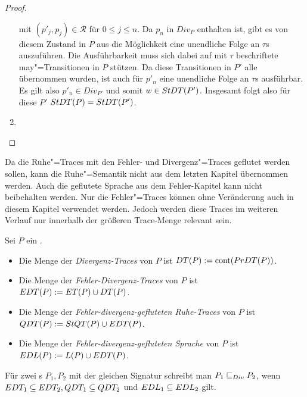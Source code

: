 \begin{proof}
\begin{enumerate}
  mit $(p'_j,p_j) \in \mathcal{R}$ für $0\leq j \leq n$. Da $p_n$ in $Div _P$
  enthalten ist, gibt es von diesem Zustand in $P$ aus die Möglichkeit eine
  unendliche Folge an $\tau$s auszuführen. Die Ausführbarkeit muss sich dabei
  auf mit $\tau$ beschriftete may"=Transitionen in $P$ stützen. Da diese
  Transitionen in $P'$ alle übernommen wurden, ist auch für $p'_n$ eine
  unendliche Folge an $\tau$s ausführbar. Es gilt also $p'_n\in Div _{P'}$ und
  somit $w\in StDT (P')$. Insgesamt folgt also für diese $P'$ $StDT (P) =
  StDT (P')$.
    \item {}
  \end{enumerate}
\end{proof}

Da die Ruhe"=Traces mit den Fehler- und Divergenz"=Traces geflutet werden
sollen, kann die Ruhe"=Semantik nicht aus dem letzten Kapitel übernommen
werden. Auch die geflutete Sprache aus dem Fehler-Kapitel kann nicht
beibehalten werden. Nur die Fehler"=Traces \ET{} können ohne Veränderung auch
in diesem Kapitel verwendet werden. Jedoch werden diese Traces im weiteren
Verlauf nur innerhalb der größeren Trace-Menge \EDT{} relevant sein.

\begin{Def}
  \label{DivSemDef}
  Sei $P$ ein \MEIO{}.
  \begin{itemize}
    \item Die Menge der \emph{Divergenz-Traces} von $P$ ist $DT (P) := \mathrm{cont}
      (PrDT (P))$.
    \item Die Menge der \emph{Fehler-Divergenz-Traces} von $P$ ist $EDT (P) :=
      ET (P)\cup DT (P)$.
    \item Die Menge der \emph{Fehler-divergenz-gefluteten
      Ruhe-Traces} von $P$ ist $QDT (P) := StQT (P)\cup EDT (P)$.
    \item Die Menge der \emph{Fehler-divergenz-gefluteten
      Sprache} von $P$ ist $EDL (P) := L(P)\cup EDT (P)$.
  \end{itemize}
  Für zwei \MEIO{}s $P_1,P_2$ mit der gleichen Signatur schreibt man $P_1 \sqsubseteq  _{Div}
  P_2$, wenn $EDT _1\subseteq EDT _2, QDT _1\subseteq QDT _2$ und $EDL
  _1\subseteq EDL _2$ gilt.
\end{Def}

\vspace{0.2cm}

